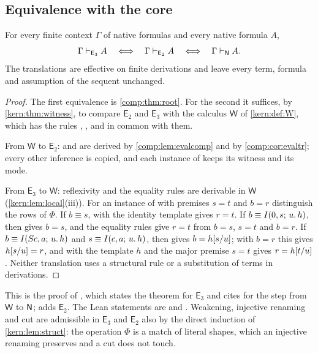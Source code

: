 \subsection{Equivalence with the core}

\begin{theorem}[Equivalence]
\label{comp:thm:eval}
For every finite context $\Gamma$ of native formulas and every native
formula $A$,
\[
 \Gamma\vdash_{\mathsf{E}_3}A
 \quad\Longleftrightarrow\quad
 \Gamma\vdash_{\mathsf{E}_2}A
 \quad\Longleftrightarrow\quad
 \Gamma\vdash_{\mathsf{N}}A .
\]
The translations are effective on finite derivations and leave every term,
formula and assumption of the sequent unchanged.
\end{theorem}

\begin{proof}
The first equivalence is \cref{comp:thm:root}. For the second it suffices,
by \cref{kern:thm:witness}, to compare $\mathsf{E}_2$ and $\mathsf{E}_3$
with the calculus $\mathsf{W}$ of \cref{kern:def:W}, which has the rules
, ,  and  in common
with them.

From $\mathsf{W}$ to $\mathsf{E}_2$:  and  are
derived by \cref{comp:lem:evalcomp} and  by
\cref{comp:cor:evaltr}; every other inference is copied, and each instance
of  keeps its witness and its mode.

From $\mathsf{E}_3$ to $\mathsf{W}$: reflexivity and the equality rules are
derivable in $\mathsf{W}$ (\cref{kern:lem:local}(iii)). For an instance of
 with premises $s=t$ and $b=r$ distinguish the rows of
$\Phi$. If $b\equiv s$,  with the identity template gives
$r=t$. If $b\equiv I(0,s;\,u.\,h)$, then  gives $b=s$, and the
equality rules give $r=t$ from $b=s$, $s=t$ and $b=r$. If
$b\equiv I(S c,a;\,u.\,h)$ and $s\equiv I(c,a;\,u.\,h)$, then
 gives $b=h[s/u]$; with $b=r$ this gives
$h[s/u]=r$, and  with the template $h$ and the major
premise $s=t$ gives $r=h[t/u]$. Neither translation uses a
structural rule or a substitution of terms in derivations.
\end{proof}

\begin{remark}
This is the proof of , which states the
theorem for $\mathsf{E}_3$ and cites  for the step
from $\mathsf{W}$ to $\mathsf{N}$;  adds
$\mathsf{E}_2$. The Lean statements are  and
. Weakening, injective renaming and cut are
admissible in $\mathsf{E}_3$ and $\mathsf{E}_2$ also by the direct
induction of \cref{kern:lem:struct}: the operation $\Phi$ is a match of
literal shapes, which an injective renaming preserves and a cut does not
touch.
\end{remark}

